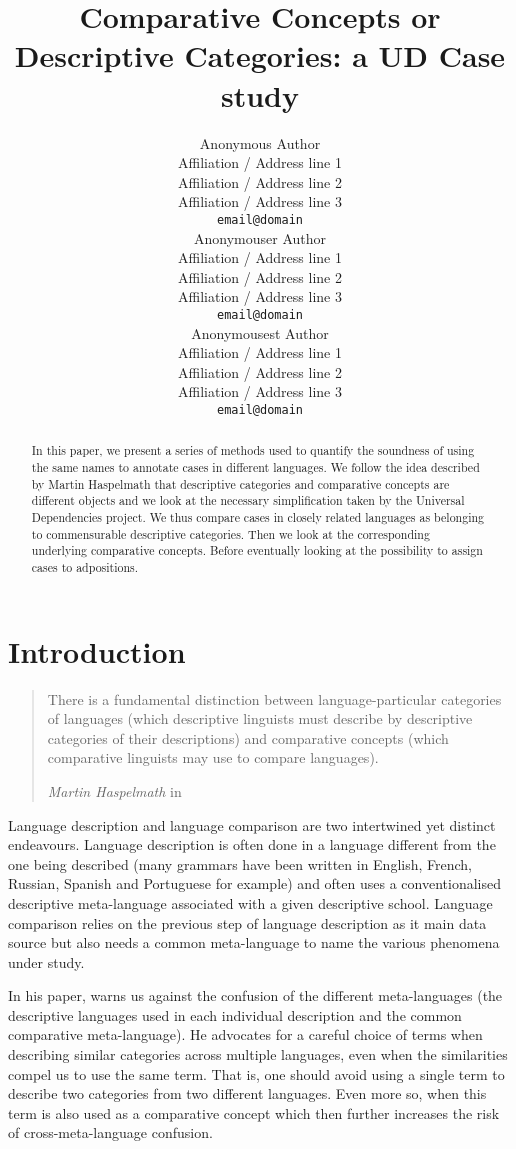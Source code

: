 \documentclass[11pt]{article}
\title{Comparative Concepts or Descriptive Categories: a UD Case study}
\author{Anonymous Author \\
 Affiliation / Address line 1 \\
 Affiliation / Address line 2 \\
 Affiliation / Address line 3 \\
 {\tt email@domain} \\\And
 Anonymouser Author \\
 Affiliation / Address line 1 \\
 Affiliation / Address line 2 \\
 Affiliation / Address line 3 \\
 {\tt email@domain} \\\And
 Anonymousest Author \\
 Affiliation / Address line 1 \\
 Affiliation / Address line 2 \\
 Affiliation / Address line 3 \\
 {\tt email@domain} \\}
\date{}
\begin{document}
\maketitle
\begin{abstract}
In this paper, we present a series of methods used to quantify the soundness of using the same names to annotate cases in different languages.
We follow the idea described by Martin Haspelmath that descriptive categories and comparative concepts are different objects and we look at the necessary simplification taken by the Universal Dependencies project. 
We thus compare cases in closely related languages as belonging to commensurable descriptive categories.
Then we look at the corresponding underlying comparative concepts.
Before eventually looking at the possibility to assign cases to adpositions.
\end{abstract}

\section{Introduction}

\begin{quote}
    There is a fundamental distinction between language-particular categories of languages (which descriptive linguists must describe by descriptive categories of their descriptions) and comparative concepts (which comparative linguists may use to compare languages).
    {\begin{flushright}\textit{Martin Haspelmath} in \cite{Has18}\end{flushright}}
\end{quote}

Language description and language comparison are two intertwined yet distinct endeavours.
Language description is often done in a language different from the one being described (many grammars have been written in English, French, Russian, Spanish and Portuguese for example) and often uses a conventionalised descriptive meta-language associated with a given descriptive school.
Language comparison relies on the previous step of language description as it main data source but also needs a common meta-language to name the various phenomena under study.

In his paper,  warns us against the confusion of the different meta-languages (the descriptive languages used in each individual description and the common comparative meta-language).
He advocates for a careful choice of terms when describing similar categories across multiple languages, even when the similarities compel us to use the same term.
That is, one should avoid using a single term to describe two categories from two different languages.
Even more so, when this term is also used as a comparative concept which then further increases the risk of cross-meta-language confusion.
\end{document}
